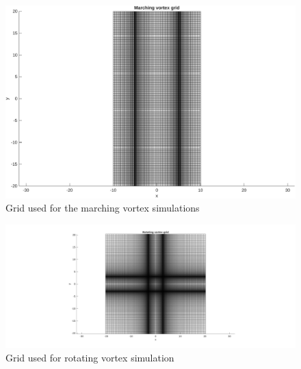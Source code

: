 \begin{figure}[H]
    \centering
    \includegraphics[width=\textwidth]{img/marching_grid.pdf}
    \caption{Grid used for the marching vortex simulations}
    \label{fig:mvortexgrid}
\end{figure}

\begin{figure}[H]
    \centering
    \includegraphics[width=\textwidth]{img/rotating_grid.pdf}
    \caption{Grid used for rotating vortex simulation}
    \label{fig:rvortexgrid}
\end{figure}






